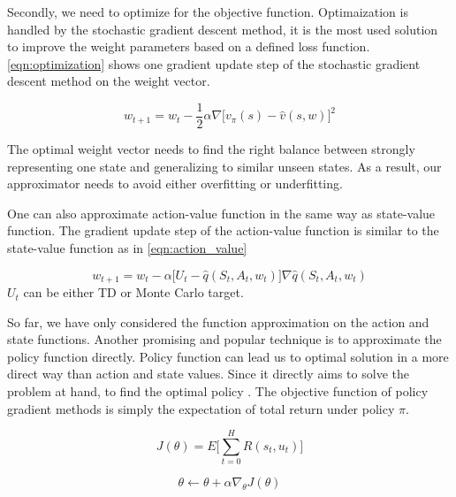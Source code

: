 Secondly, we need to optimize for the objective function. Optimaization is handled by the stochastic gradient descent method, it is the most used solution to improve the weight parameters based on a defined loss function. \ref{eqn:optimization} shows one gradient update step of the stochastic gradient descent method on the weight vector.  

\begin{equation}
    \label{eqn:optimization}
    w_{t+1} = w_t - \frac{1}{2}\alpha\nabla\Big[v_{\pi}(s) - \hat{v}(s,w)\Big]^2
\end{equation}

The optimal weight vector needs to find the right balance between strongly representing one state and generalizing to similar unseen states. As a result, our approximator needs to avoid either overfitting or underfitting.


One can also approximate action-value function in the same way as state-value function. The gradient update step of the action-value function is similar to the state-value function as in \ref{eqn:action_value}

\begin{equation}
    \label{eqn:action_value}
    w_{t+1} = w_t -\alpha\Big[U_t - \hat{q}(S_t,A_t, w_t)\Big]\nabla\hat{q}(S_t, A_t, w_t)
\end{equation}
\(U_t\) can be either TD or Monte Carlo target.


So far, we have only considered the function approximation on the action and state functions.  Another promising and popular technique is to approximate the policy function directly. Policy function can lead us to optimal solution in a more direct way than action and state values. Since it directly aims to solve the problem at hand, to find the optimal policy \cite{SpinningUp2018}.
The objective function of policy gradient methods is simply the expectation of total return under policy \(\pi\).

\begin{equation}
    \label{eqn:policy-objective}
    J(\theta) = E\Big[\sum\limits_{t=0}^H R(s_t, u_t)\Big]
\end{equation}


\begin{equation}
    \theta \leftarrow \theta + \alpha\nabla_{\theta}J(\theta) 
\end{equation}